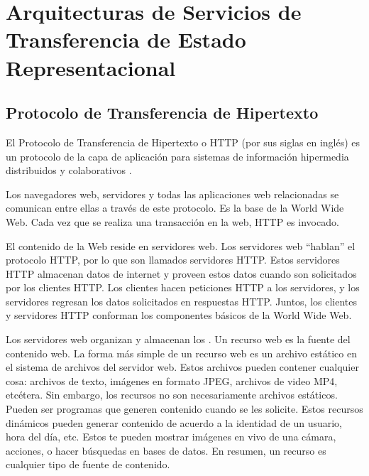 
\section{Arquitecturas de Servicios de Transferencia de Estado Representacional}
\label{\detokenize{chapter_one/rest:arquitecturas-de-servicios-de-transferencia-de-estado-representacional}}\label{\detokenize{chapter_one/rest::doc}}

\subsection{Protocolo de Transferencia de Hipertexto}
\label{\detokenize{chapter_one/rest:protocolo-de-transferencia-de-hipertexto}}
\begin{remark}
El Protocolo de Transferencia de Hipertexto o HTTP (por sus siglas en inglés)
es un protocolo de la capa de aplicación para sistemas de información
hipermedia distribuidos y colaborativos \cite{fieldinghttp}.

\end{remark}

Los navegadores web, servidores y todas las aplicaciones web
relacionadas se comunican entre ellas a través de este protocolo. Es la
base de la World Wide Web. Cada vez que se realiza una transacción en la
web, HTTP es invocado.

El contenido de la Web reside en servidores web. Los servidores web
“hablan” el protocolo HTTP, por lo que son llamados servidores HTTP.
Estos servidores HTTP almacenan datos de internet y proveen estos datos
cuando son solicitados por los clientes HTTP. Los clientes hacen
peticiones HTTP a los servidores, y los servidores regresan los datos
solicitados en respuestas HTTP. Juntos, los clientes y servidores HTTP
conforman los componentes básicos de la World Wide Web.

Los servidores web organizan y almacenan los . Un recurso
web es la fuente del contenido web. La forma más simple de un recurso
web es un archivo estático en el sistema de archivos del servidor web.
Estos archivos pueden contener cualquier cosa: archivos de texto,
imágenes en formato JPEG, archivos de video MP4, etcétera. Sin embargo,
los recursos no son necesariamente archivos estáticos. Pueden ser
programas que generen contenido cuando se les solicite. Estos recursos
dinámicos pueden generar contenido de acuerdo a la identidad de un
usuario, hora del día, etc. Estos te pueden mostrar imágenes en vivo de
una cámara, acciones, o hacer búsquedas en bases de datos.
En resumen, un recurso es cualquier tipo de fuente de contenido.

